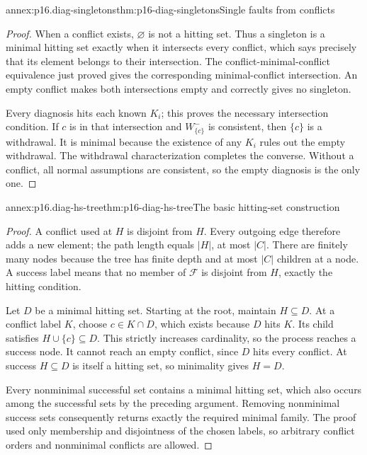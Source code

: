 \begin{annexitem}{annex:p16.diag-singletons}{thm:p16-diag-singletons}{Single faults from conflicts}
\begin{proof}
When a conflict exists, \(\varnothing\) is not a hitting
set. Thus a singleton is a minimal hitting set exactly
when it intersects every conflict, which says precisely
that its element belongs to their intersection.
The conflict-minimal-conflict equivalence just proved
gives the corresponding minimal-conflict intersection.
An empty conflict makes both intersections empty and
correctly gives no singleton.

Every diagnosis hits each known \(K_i\); this proves
the necessary intersection condition. If \(c\) is in
that intersection and \(W^-_{\{c\}}\) is consistent,
then \(\{c\}\) is a withdrawal. It is minimal because
the existence of any \(K_i\) rules out the empty
withdrawal. The withdrawal characterization completes
the converse. Without a conflict, all normal assumptions
are consistent, so the empty diagnosis is the only one.
\end{proof}
\end{annexitem}

\begin{annexitem}{annex:p16.diag-hs-tree}{thm:p16-diag-hs-tree}{The basic hitting-set construction}
\begin{proof}
A conflict used at \(H\) is disjoint from \(H\).
Every outgoing edge therefore adds a new element;
the path length equals \(|H|\), at most \(|C|\).
There are finitely many nodes because the tree has
finite depth and at most \(|C|\) children at a node.
A success label means that no member of \(\mathcal F\)
is disjoint from \(H\), exactly the hitting condition.

Let \(D\) be a minimal hitting set. Starting at the root,
maintain \(H\subseteq D\). At a conflict label \(K\),
choose \(c\in K\cap D\), which exists because \(D\)
hits \(K\). Its child satisfies
\(H\cup\{c\}\subseteq D\). This strictly increases
cardinality, so the process reaches a success node.
It cannot reach an empty conflict, since \(D\) hits
every conflict. At success \(H\subseteq D\) is itself
a hitting set, so minimality gives \(H=D\).

Every nonminimal successful set contains a minimal
hitting set, which also occurs among the successful
sets by the preceding argument. Removing nonminimal
success sets consequently returns exactly the required
minimal family. The proof used only membership and
disjointness of the chosen labels, so arbitrary conflict
orders and nonminimal conflicts are allowed.
\end{proof}
\end{annexitem}

